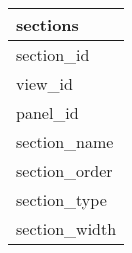 \documentclass{article}
\begin{document}

\begin{tabular}{|l|} \hline
\textbf{sections} \\ \hline
section\_id \\ \hline
view\_id \\ \hline
panel\_id \\ \hline
section\_name \\ \hline
section\_order \\ \hline
section\_type \\ \hline
section\_width \\ \hline
\end{tabular}
\end{document}
